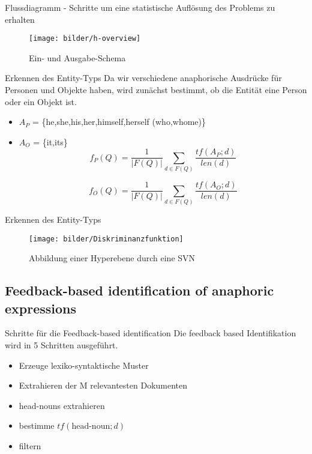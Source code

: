 \documentclass{beamer}
\begin{document}
\begin{frame}{Flussdiagramm - Schritte um eine statistische Auflösung des Problems zu erhalten}

	\begin{figure}
		\texttt{[image: bilder/h-overview]}
		\caption{Ein- und Ausgabe-Schema}
		\label{pic:h-overview}
	\end{figure}
\end{frame}

\begin{frame}{Erkennen des Entity-Typs}
Da wir verschiedene anaphorische Ausdrücke für Personen und Objekte haben, wird zunächst bestimmt, ob die Entität eine Person oder ein Objekt ist.\\
\begin{itemize}
\item $A_P$ = \{he,she,his,her,himself,herself (who,whome)\}
\item $A_O$ = \{it,its\}
	\[ f_P(Q) = \frac{1}{|F(Q)|} \sum_{d \in F(Q)} \frac{tf(A_P;d)}{len(d)}\]

	\[ f_O(Q) = \frac{1}{|F(Q)|} \sum_{d \in F(Q)} \frac{tf(A_O;d)}{len(d)}\]
\end{itemize}
\end{frame}

\begin{frame}{Erkennen des Entity-Typs}

	\begin{figure}
		\texttt{[image: bilder/Diskriminanzfunktion]}
		\caption{Abbildung einer Hyperebene durch eine SVN \cite{wiki:svn}}
		\label{pic:Diskriminanzfunktion}
	\end{figure}

\end{frame}


\subsection{Feedback-based identification of anaphoric expressions}

\begin{frame}{Schritte für die Feedback-based identification}
Die feedback based Identifikation wird in 5 Schritten ausgeführt.
\begin{itemize}
	\item Erzeuge lexiko-syntaktische Muster
	\item Extrahieren der M relevantesten Dokumenten
	\item head-nouns extrahieren
	\item bestimme $tf(\text{head-noun};d)$
	\item filtern
\end{itemize}
\end{frame}
\end{document}
